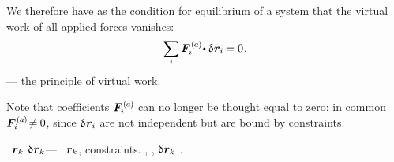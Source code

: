We therefore have as the condition for equilibrium of a system that the virtual work of all applied forces vanishes:
\[
\displaystyle\sum_{\smash{i}} \bm{F}_{i}^{\smthactive} \hspace{-0.25ex} \dotp \variation{\hspace{.1ex}\locationvector_i} \hspace{-0.1ex} = 0
\hspace{.15ex} .
\]
--- the principle of virtual work.

Note that coefficients ${\bm{F}_{i}^{\smthactive}}$ can no longer be thought equal to zero: in common ${\bm{F}_{i}^{\smthactive} \hspace{-0.3ex} \neq \hspace{-0.1ex} 0}$, since ${\variation{\hspace{.1ex}\locationvector_i}}$ are not independent but are bound by constraints.

~${\bm{r}_k}$
${\variation{\hspace{.1ex}\locationvector_k}}$\:---
~${\bm{r}_k}$,
constraints\ru{)}.
,
,
${\variation{\hspace{.1ex}\locationvector_k}}$
.

